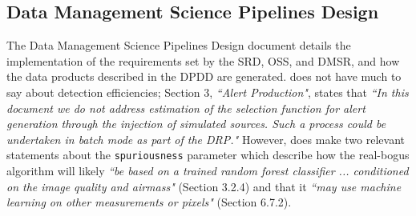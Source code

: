 \documentclass[DM,lsstdraft,toc]{lsstdoc}
\begin{document}



\subsection{Data Management Science Pipelines Design}\label{ssec:docs_ldm151}

The Data Management Science Pipelines Design document  details the implementation of the requirements set by the SRD, OSS, and DMSR, and how the data products described in the DPDD are generated.  does not have much to say about detection efficiencies; Section 3, {\it ``Alert Production"}, states that {\it ``In this document we do not address estimation of the selection function for alert generation through the injection of simulated sources. Such a process could be undertaken in batch mode as part of the DRP."} However,  does make two relevant statements about the {\tt spuriousness} parameter which describe how the real-bogus algorithm will likely {\it ``be based on a trained random forest classifier ... conditioned on the image quality and airmass"} (Section 3.2.4) and that it  {\it ``may use machine learning on other measurements or pixels"} (Section 6.7.2).
\end{document}
